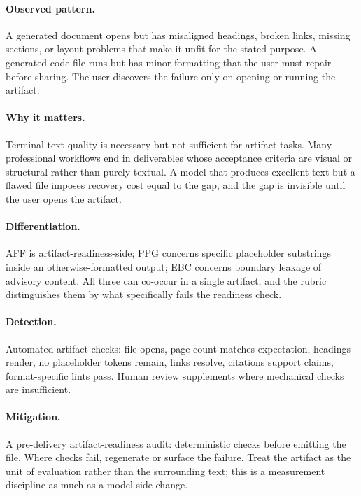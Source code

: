 \documentclass[11pt]{article}
\begin{document}
\paragraph{Observed pattern.} A generated document opens but has misaligned headings, broken links, missing sections, or layout problems that make it unfit for the stated purpose. A generated code file runs but has minor formatting that the user must repair before sharing. The user discovers the failure only on opening or running the artifact.

\paragraph{Why it matters.} Terminal text quality is necessary but not sufficient for artifact tasks. Many professional workflows end in deliverables whose acceptance criteria are visual or structural rather than purely textual. A model that produces excellent text but a flawed file imposes recovery cost equal to the gap, and the gap is invisible until the user opens the artifact.

\paragraph{Differentiation.} AFF is artifact-readiness-side; PPG concerns specific placeholder substrings inside an otherwise-formatted output; EBC concerns boundary leakage of advisory content. All three can co-occur in a single artifact, and the rubric distinguishes them by what specifically fails the readiness check.

\paragraph{Detection.} Automated artifact checks: file opens, page count matches expectation, headings render, no placeholder tokens remain, links resolve, citations support claims, format-specific lints pass. Human review supplements where mechanical checks are insufficient.

\paragraph{Mitigation.} A pre-delivery artifact-readiness audit: deterministic checks before emitting the file. Where checks fail, regenerate or surface the failure. Treat the artifact as the unit of evaluation rather than the surrounding text; this is a measurement discipline as much as a model-side change.
\end{document}
